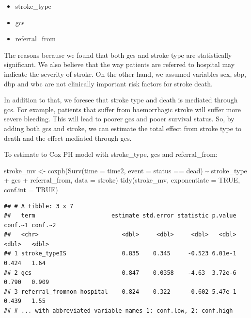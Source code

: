 \documentclass[
  10pt,
]{krantz}
\newenvironment{Shaded}{\begin{snugshade}}{\end{snugshade}}
\newcommand{\AttributeTok}[1]{\textcolor[rgb]{0.77,0.63,0.00}{#1}}
\newcommand{\ConstantTok}[1]{\textcolor[rgb]{0.00,0.00,0.00}{#1}}
\newcommand{\FunctionTok}[1]{\textcolor[rgb]{0.00,0.00,0.00}{#1}}
\newcommand{\NormalTok}[1]{#1}
\newcommand{\OtherTok}[1]{\textcolor[rgb]{0.56,0.35,0.01}{#1}}
\newcommand{\SpecialCharTok}[1]{\textcolor[rgb]{0.00,0.00,0.00}{#1}}
\newcommand{\StringTok}[1]{\textcolor[rgb]{0.31,0.60,0.02}{#1}}
\providecommand{\tightlist}{%
  \setlength{\itemsep}{0pt}\setlength{\parskip}{0pt}}
\begin{document}
\begin{itemize}
\tightlist
\item
  stroke\_type
\item
  gcs
\item
  referral\_from
\end{itemize}

The reasons because we found that both gcs and stroke type are statistically significant. We also believe that the way patients are referred to hospital may indicate the severity of stroke. On the other hand, we assumed variables sex, sbp, dbp and wbc are not clinically important risk factors for stroke death.

In addition to that, we foresee that stroke type and death is mediated through gcs. For example, patients that suffer from haemorrhagic stroke will suffer more severe bleeding. This will lead to poorer gcs and pooer survival status. So, by adding both gcs and stroke, we can estimate the total effect from stroke type to death and the effect mediated through gcs.

To estimate to Cox PH model with stroke\_type, gcs and referral\_from:

\begin{Shaded}
\begin{Highlighting}[]
\NormalTok{stroke\_mv }\OtherTok{\textless{}{-}} 
  \FunctionTok{coxph}\NormalTok{(}\FunctionTok{Surv}\NormalTok{(}\AttributeTok{time =}\NormalTok{ time2, }
             \AttributeTok{event =}\NormalTok{ status }\SpecialCharTok{==} \StringTok{\textquotesingle{}dead\textquotesingle{}}\NormalTok{) }\SpecialCharTok{\textasciitilde{}}\NormalTok{ stroke\_type }\SpecialCharTok{+}\NormalTok{  gcs }\SpecialCharTok{+}\NormalTok{ referral\_from, }
        \AttributeTok{data =}\NormalTok{ stroke)}
\FunctionTok{tidy}\NormalTok{(stroke\_mv, }\AttributeTok{exponentiate =} \ConstantTok{TRUE}\NormalTok{, }\AttributeTok{conf.int =} \ConstantTok{TRUE}\NormalTok{)}
\end{Highlighting}
\end{Shaded}

\begin{verbatim}
## # A tibble: 3 x 7
##   term                      estimate std.error statistic p.value conf.~1 conf.~2
##   <chr>                        <dbl>     <dbl>     <dbl>   <dbl>   <dbl>   <dbl>
## 1 stroke_typeIS                0.835    0.345     -0.523 6.01e-1   0.424   1.64 
## 2 gcs                          0.847    0.0358    -4.63  3.72e-6   0.790   0.909
## 3 referral_fromnon-hospital    0.824    0.322     -0.602 5.47e-1   0.439   1.55 
## # ... with abbreviated variable names 1: conf.low, 2: conf.high
\end{verbatim}
\end{document}
